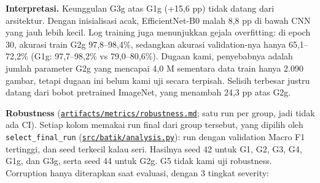 \documentclass[10pt,a4paper]{article}
\begin{document}
\textbf{Interpretasi.} Keunggulan G3g atas G1g (+15,6 pp) tidak datang dari arsitektur. Dengan inisialisasi acak, EfficientNet-B0 malah 8,8 pp di bawah CNN yang jauh lebih kecil. Log training juga menunjukkan gejala overfitting: di epoch 30, akurasi train G2g 97,8--98,4\%, sedangkan akurasi validation-nya hanya 65,1--72,2\% (G1g: 97,7--98,2\% vs 79,0--80,6\%). Dugaan kami, penyebabnya adalah jumlah parameter G2g yang mencapai 4,0 M sementara data train hanya 2.090 gambar, tetapi dugaan ini belum kami uji secara terpisah. Selisih terbesar justru datang dari bobot pretrained ImageNet, yang menambah 24,3 pp atas G2g.

\textbf{Robustness} (\href{https://github.com/Universitas-Cakrawala/semarang-batik-fine-grained-transfer-learning/blob/main/artifacts/metrics/robustness.md}{\texttt{artifacts/\allowbreak{}metrics/\allowbreak{}robustness.md}}; satu run per group, jadi tidak ada CI). Setiap kolom memakai run final dari group tersebut, yang dipilih oleh \texttt{select\_\allowbreak{}final\_\allowbreak{}run} (\href{https://github.com/Universitas-Cakrawala/semarang-batik-fine-grained-transfer-learning/blob/main/src/batik/analysis.py}{\texttt{src/\allowbreak{}batik/\allowbreak{}analysis.py}}): run dengan validation Macro F1 tertinggi, dan seed terkecil kalau seri. Hasilnya seed 42 untuk G1, G2, G3, G4, G1g, dan G3g, serta seed 44 untuk G2g. G5 tidak kami uji robustness. Corruption hanya diterapkan saat evaluasi, dengan 3 tingkat severity:
\end{document}
